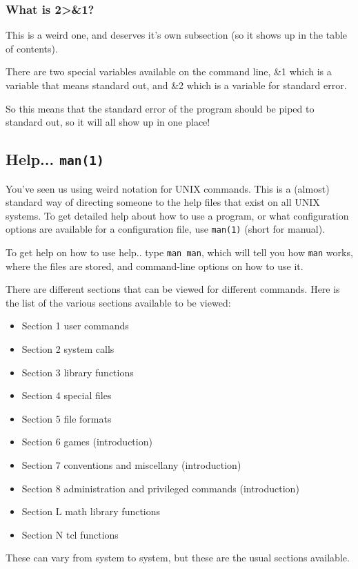 \subsubsection{What is 2>\&1?}
This is a weird one, and deserves it's own subsection (so it shows up in the 
table of contents).

There are two special variables available on the command line, \&1
which is a variable that means standard out, and \&2 which is 
a variable for standard error. 

So this means that the standard error of the program should be 
piped to standard out, so it will all show up in one place!
    
		
\subsection {Help... {\tt man(1)}}
You've seen us using weird notation for UNIX commands. This is a (almost) standard
way of directing someone to the help files that exist on all UNIX systems. 
To get detailed help about how to use a program, or what configuration
options are available for a configuration file, use {\tt man(1)} (short for manual).

To get help on how to use help.. type {\tt man man}, which will 
tell you how {\tt man} works, where the files are stored, and 
command-line options on how to use it.

There are different sections that can be viewed for different commands.
Here is the list of the various sections available to be viewed:

\begin{itemize}
\item Section 1
user commands 
\item Section 2
system calls 
\item Section 3
library functions 
\item Section 4
special files 
\item Section 5
file formats 
\item Section 6
games (introduction)
\item Section 7
conventions and miscellany (introduction)
\item Section 8
administration and privileged commands (introduction)
\item Section L
math library functions
\item Section N
tcl functions
\end{itemize}

These can vary from system to system, but these are the usual sections available.

